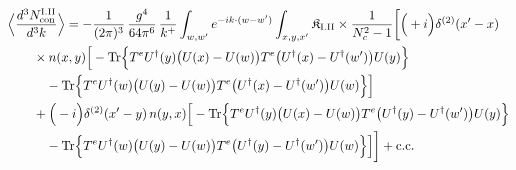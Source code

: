 \begingroup\small
\begin{align}\label{eq:S-I.II-2}
&\Big\langle\frac{d^{3}N^{\rm I.II}_{{\rm con}}}{d^{3}k}\Big\rangle=-\frac{1}{(2\pi)^{3}}\, \frac{g^{4}}{64\pi^{6}}\, \frac{1}{k^{+}} \int_{w,w'}e^{-ik\cdot(w-w')} \int_{x,y,x'} \mathfrak{K}_{\rm I.II} \times \frac{1}{N_{c}^{2}-1}\bigg[\Big(+i\Big)\delta^{(2)}(x'-x)\notag\\
&\quad\quad \times n(x,y)\Big[ -{\rm Tr}\Big\{T^{e}U^{\dagger}(y)\big(U(x)-U(w)\big)T^{e}\big(U^{\dagger}(x)-U^{\dagger}(w')\big)U(y)\Big\}\notag\\
&\quad\quad\quad -{\rm Tr}\Big\{T^{e}U^{\dagger}(w)\big(U(y)-U(w)\big)T^{e}\big(U^{\dagger}(x)-U^{\dagger}(w')\big)U(w)\Big\}\Big]\notag\\
&\quad\quad +\Big(-i\Big)\delta^{(2)}(x'-y)\, n(y,x)\Big[ -{\rm Tr}\Big\{T^{e}U^{\dagger}(y)\big(U(x)-U(w)\big)T^{e}\big(U^{\dagger}(y)-U^{\dagger}(w')\big)U(y)\Big\}\notag\\
&\quad\quad\quad -{\rm Tr}\Big\{T^{e}U^{\dagger}(w)\big(U(y)-U(w)\big)T^{e}\big(U^{\dagger}(y)-U^{\dagger}(w')\big)U(w)\Big\}\Big]\bigg] +{\rm c.c.}
\end{align}
\endgroup

